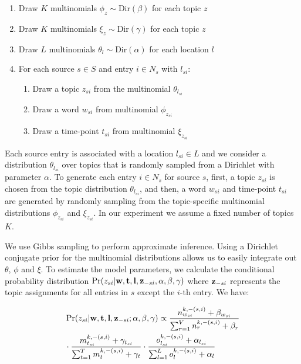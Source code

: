 \documentclass[twoside,leqno,twocolumn]{article}
\newcommand{\w}{{\bf w}}
\newcommand{\z}{{\bf z}}
\newcommand{\loc}{{\bf l}}
\newcommand{\tim}{{\bf t}}
\begin{document}
\begin{enumerate}[noitemsep]
\item Draw $K$ multinomials $\phi_z\sim\mbox{Dir}(\beta)$ for each topic $z$
\item Draw $K$ multinomials $\xi_z\sim\mbox{Dir}(\gamma)$ for each topic $z$
\item Draw $L$ multinomials $\theta_l\sim\mbox{Dir}(\alpha)$ for each location $l$
\item For each source  $s \in S$ and entry $i \in N_s$ with $l_{si}$:
\begin{enumerate}
\item Draw a topic $z_{si}$ from the multinomial $\theta_{l_{si}}$
\item Draw a word $w_{si}$ from multinomial $\phi_{z_{si}}$
\item Draw a time-point $t_{si}$ from multinomial $\xi_{z_{si}}$
\end{enumerate}
\end{enumerate}

Each source entry is associated with a location $l_{si} \in L$ and we consider a distribution $\theta_{l_{si}}$ over topics that is randomly sampled from a Dirichlet with parameter $\alpha$. To generate each entry $i \in N_s$ for source $s$, first, a topic $z_{si}$ is chosen from the topic distribution $\theta_{l_{si}}$, and then, a word $w_{si}$ and time-point $t_{si}$ are generated by randomly sampling from the topic-specific multinomial distributions $\phi_{z_{si}}$ and $\xi_{z_{si}}$.  In our experiment we assume a fixed number of topics $K$.

We use Gibbs sampling to perform approximate inference. Using a Dirichlet conjugate prior for the multinomial distributions allows us to easily integrate out $\theta$, $\phi$ and $\xi$.  To estimate the model parameters, we calculate the conditional probability distribution $\Pr(z_{si}|{\bf w},{\bf t}, {\bf l}, {\bf z}_{-si}, \alpha, \beta, \gamma)$ where ${\bf z}_{-si}$ represents the topic assignments for all entries in $s$ except the $i$-th entry. We have: \vspace{-10pt}

{\small \begin{align}
\label{eq:conditional}
&\Pr(z_{si}| \w,\tim,\loc,\z_{-si};\alpha,\beta,\gamma) \propto \frac{n^{k,-(s,i)}_{w_{si}} + \beta_{w_{si}}}{\sum_{r = 1}^V n^{k,-(s,i)}_{r} + \beta_{r}}  \nonumber \\
& \cdot \frac{m^{k,-(s,i)}_{t_{si}} + \gamma_{t_{si}}}{\sum_{t = 1}^T m^{k,-(s,i)}_{t} + \gamma_{t}} \cdot \frac{o^{k,-(s,i)}_{l_{si}} + \alpha_{l_{si}}}{\sum_{l = 1}^L o^{k,-(s,i)}_{l} + \alpha_{l}}
\end{align}}
\end{document}
